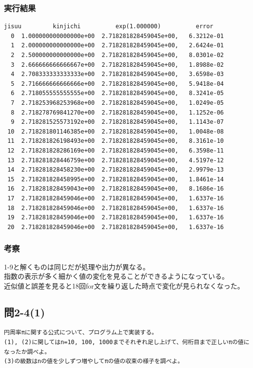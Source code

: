 \documentclass{jarticle}
\begin{document}
\subsubsection{実行結果\\}
\begin{breakbox}
\begin{verbatim}
jisuu         kinjichi          exp(1.000000)          error
  0  1.000000000000000e+00  2.718281828459045e+00,   6.3212e-01
  1  2.000000000000000e+00  2.718281828459045e+00,   2.6424e-01
  2  2.500000000000000e+00  2.718281828459045e+00,   8.0301e-02
  3  2.666666666666667e+00  2.718281828459045e+00,   1.8988e-02
  4  2.708333333333333e+00  2.718281828459045e+00,   3.6598e-03
  5  2.716666666666666e+00  2.718281828459045e+00,   5.9418e-04
  6  2.718055555555555e+00  2.718281828459045e+00,   8.3241e-05
  7  2.718253968253968e+00  2.718281828459045e+00,   1.0249e-05
  8  2.718278769841270e+00  2.718281828459045e+00,   1.1252e-06
  9  2.718281525573192e+00  2.718281828459045e+00,   1.1143e-07
 10  2.718281801146385e+00  2.718281828459045e+00,   1.0048e-08
 11  2.718281826198493e+00  2.718281828459045e+00,   8.3161e-10
 12  2.718281828286169e+00  2.718281828459045e+00,   6.3598e-11
 13  2.718281828446759e+00  2.718281828459045e+00,   4.5197e-12
 14  2.718281828458230e+00  2.718281828459045e+00,   2.9979e-13
 15  2.718281828458995e+00  2.718281828459045e+00,   1.8461e-14
 16  2.718281828459043e+00  2.718281828459045e+00,   8.1686e-16
 17  2.718281828459046e+00  2.718281828459045e+00,   1.6337e-16
 18  2.718281828459046e+00  2.718281828459045e+00,   1.6337e-16
 19  2.718281828459046e+00  2.718281828459045e+00,   1.6337e-16
 20  2.718281828459046e+00  2.718281828459045e+00,   1.6337e-16
\end{verbatim}
\end{breakbox}
\subsubsection{考察\\}
1-9と解くものは同じだが処理や出力が異なる。\\
指数の表示が多く細かく値の変化を見ることができるようになっている。\\
近似値と誤差を見ると18回for文を繰り返した時点で変化が見られなくなった。\\


\subsection{問2-4(1)\\}
\begin{verbatim}
円周率πに関する公式について、プログラム上で実装する。
(1), (2)に関してはn=10, 100, 1000までそれぞれ足し上げて、何桁目まで正しいπの値になったか調べよ。
(3)の級数はnの値を少しずつ増やしてπの値の収束の様子を調べよ。
\end{verbatim}
\end{document}
